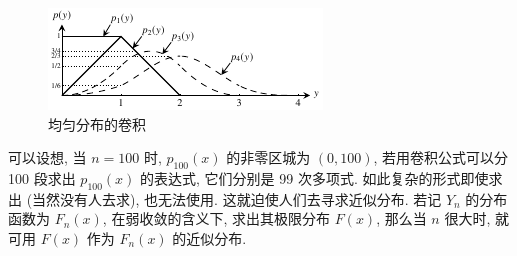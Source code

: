 \begin{figure}
    \centering
    \includegraphics[width=0.9\linewidth]{figure/fig4-4-1.pdf}
    \caption{均匀分布的卷积}\label{fig:4.4.1}
\end{figure}

可以设想, 当 $ n = 100 $ 时, $ p_{100} (x) $ 的非零区城为 $ ( 0, 100 ) $, 若用卷积公式可以分 100 段求出 $ p_{100} ( x ) $ 的表达式, 它们分别是 99 次多项式.
如此复杂的形式即使求出 (当然没有人去求), 也无法使用.
这就迫使人们去寻求近似分布.
若记 $ Y_n $ 的分布函数为 $ F_n (x) $, 在弱收敛的含义下, 求出其极限分布 $ F (x) $, 那么当 $ n $ 很大时, 就可用 $ F(x) $ 作为 $ F_n (x) $ 的近似分布.

